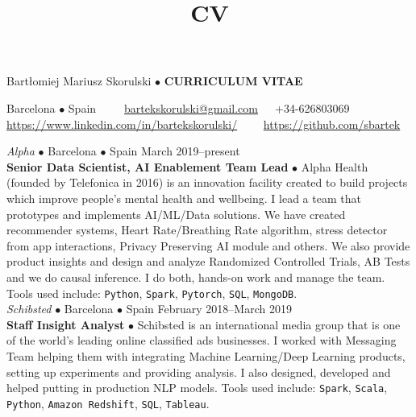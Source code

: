 \documentclass[a4paper, oneside]{scrreprt}
\title{CV}
\author{}
\date{}
\begin{document}
\vspace{0.4cm}
\noindent Bartłomiej Mariusz Skorulski $\bullet$ \textbf{CURRICULUM VITAE}

\vspace{-0.3cm}
\noindent\makebox[\linewidth]{\rule{\textwidth}{0.4pt}}

\noindent\llap{\FA \faHome\ \ } Barcelona $\bullet$ Spain\ \
{\FA \faEnvelope\ \ }\ \href{mailto:bartekskorulski@gmail.com}{bartekskorulski@gmail.com}\ \ 
{\FA \faMobilePhone}\  +34-626803069\\
\noindent\llap{\FA \faLinkedin\ \ } 
\href{https://www.linkedin.com/in/bartekskorulski/}{https://www.linkedin.com/in/bartekskorulski/}\ \ 
{\FA \faGithub\ \ } \href{https://github.com/sbartek}{https://github.com/sbartek}

\vspace{-0.3cm}
\noindent\makebox[\linewidth]{\rule{\textwidth}{0.4pt}}
\vspace{-0.2cm}
\marginpar{
  \sectit{Main Professional Experience}
}

\vspace{-0.3cm}
\noindent{}
\hspace{-0.15cm}\textit{Alpha} $\bullet$
Barcelona $\bullet$ Spain \hfill March 2019--present\\
\noindent\textbf{\small Senior Data Scientist, AI Enablement Team Lead} $\bullet$ 
{\small Alpha Health (founded by Telefonica in 2016) is an innovation facility created to build
  projects which improve people's mental health and wellbeing.  I lead a team that prototypes and
  implements AI/ML/Data solutions. We have created recommender systems, Heart Rate/Breathing Rate
  algorithm, stress detector from app interactions, Privacy Preserving AI module and others. We also
  provide product insights and design and analyze Randomized Controlled Trials, AB Tests and we do
  causal inference. I do both, hands-on work and manage the team.  Tools used include:
  \texttt{Python}, \texttt{Spark}, \texttt{Pytorch}, \texttt{SQL},
  \texttt{MongoDB}. }\\

\vspace{-0.3cm}
\noindent{}
\hspace{-0.15cm}\textit{Schibsted} $\bullet$ 
Barcelona $\bullet$ Spain \hfill February 2018--March 2019\\
\noindent\textbf{\small Staff Insight Analyst } $\bullet$ 
{\small Schibsted is an international media group that is one of the world’s leading online
  classified ads businesses.  I worked with Messaging Team helping them with integrating
  Machine Learning/Deep Learning products, setting up experiments and providing analysis. I also
  designed, developed and helped putting in production NLP models. Tools used include:
  \texttt{Spark}, \texttt{Scala}, \texttt{Python}, 
  \texttt{Amazon Redshift}, \texttt{SQL}, \texttt{Tableau}. }\\
\end{document}
